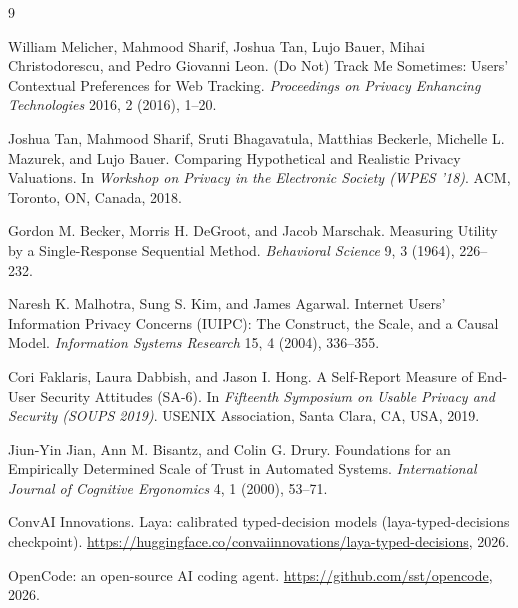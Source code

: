 \documentclass[sigconf,nonacm]{acmart}
\begin{document}
\begin{thebibliography}{9}

William Melicher, Mahmood Sharif, Joshua Tan, Lujo Bauer, Mihai Christodorescu, and Pedro Giovanni Leon.
\newblock (Do Not) Track Me Sometimes: Users' Contextual Preferences for Web Tracking.
\newblock \emph{Proceedings on Privacy Enhancing Technologies} 2016, 2 (2016), 1--20.

Joshua Tan, Mahmood Sharif, Sruti Bhagavatula, Matthias Beckerle, Michelle L. Mazurek, and Lujo Bauer.
\newblock Comparing Hypothetical and Realistic Privacy Valuations.
\newblock In \emph{Workshop on Privacy in the Electronic Society (WPES '18)}. ACM, Toronto, ON, Canada, 2018.

Gordon M. Becker, Morris H. DeGroot, and Jacob Marschak.
\newblock Measuring Utility by a Single-Response Sequential Method.
\newblock \emph{Behavioral Science} 9, 3 (1964), 226--232.

Naresh K. Malhotra, Sung S. Kim, and James Agarwal.
\newblock Internet Users' Information Privacy Concerns (IUIPC): The Construct, the Scale, and a Causal Model.
\newblock \emph{Information Systems Research} 15, 4 (2004), 336--355.

Cori Faklaris, Laura Dabbish, and Jason I. Hong.
\newblock A Self-Report Measure of End-User Security Attitudes (SA-6).
\newblock In \emph{Fifteenth Symposium on Usable Privacy and Security (SOUPS 2019)}. USENIX Association, Santa Clara, CA, USA, 2019.

Jiun-Yin Jian, Ann M. Bisantz, and Colin G. Drury.
\newblock Foundations for an Empirically Determined Scale of Trust in Automated Systems.
\newblock \emph{International Journal of Cognitive Ergonomics} 4, 1 (2000), 53--71.

ConvAI Innovations.
\newblock Laya: calibrated typed-decision models (laya-typed-decisions checkpoint).
\newblock \url{https://huggingface.co/convaiinnovations/laya-typed-decisions}, 2026.

OpenCode: an open-source AI coding agent.
\newblock \url{https://github.com/sst/opencode}, 2026.

\end{thebibliography}
\end{document}
